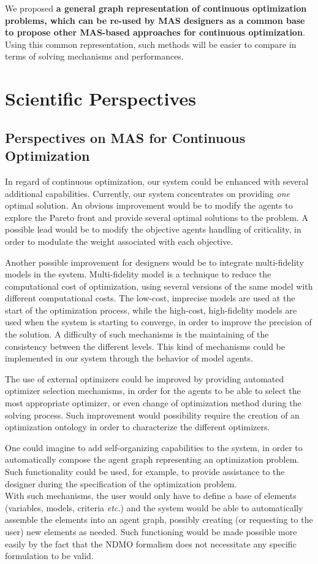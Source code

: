 We proposed \textbf{a general graph representation of continuous optimization problems, which can be re-used by MAS designers as a common base to propose other MAS-based approaches for continuous optimization}. Using this common representation, such methods will be easier to compare in terms of solving mechanisms and performances.

\section*{Scientific Perspectives}

\subsection*{Perspectives on MAS for Continuous Optimization}

In regard of continuous optimization, our system could be enhanced with several additional capabilities. Currently, our system concentrates on providing \emph{one} optimal solution. An obvious improvement would be to modify the agents to explore the Pareto front and provide several optimal solutions to the problem. A possible lead would be to modify the objective agents handling of criticality, in order to modulate the weight associated with each objective.

Another possible improvement for designers would be to integrate multi-fidelity models in the system. Multi-fidelity model is a technique to reduce the computational cost of optimization, using several versions of the same model with different computational costs. The low-cost, imprecise models are used at the start of the optimization process, while the high-cost, high-fidelity models are used when the system is starting to converge, in order to improve the precision of the solution. A difficulty of such mechanisms is the maintaining of the consistency between the different levels. This kind of mechanisms could be implemented in our system through the behavior of model agents.

The use of external optimizers could be improved by providing automated optimizer selection mechanisms, in order for the agents to be able to select the most appropriate optimizer, or even change of optimization method during the solving process. Such improvement would possibility require the creation of an optimization ontology in order to characterize the different optimizers.

One could imagine to add self-organizing capabilities to the system, in order to automatically compose the agent graph representing an optimization problem. Such functionality could be used, for example, to provide assistance to the designer during the specification of the optimization problem.\\
With such mechanisms, the user would only have to define a base of elements (variables, models, criteria \emph{etc.}) and the system would be able to automatically assemble the elements into an agent graph, possibly creating (or requesting to the user) new elements as needed. Such functioning would be made possible more easily by the fact that the NDMO formalism does not necessitate any specific formulation to be valid.

